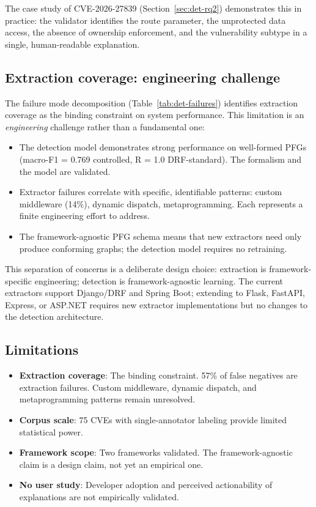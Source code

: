 The case study of CVE-2026-27839 (Section~\ref{sec:det-rq2}) demonstrates
this in practice: the validator identifies the route parameter, the
unprotected data access, the absence of ownership enforcement, and the
vulnerability subtype in a single, human-readable explanation.

\subsection{Extraction coverage: engineering challenge}
\label{sec:det-extraction-challenge}

The failure mode decomposition (Table~\ref{tab:det-failures}) identifies
extraction coverage as the binding constraint on system performance. This
limitation is an \emph{engineering} challenge rather than a fundamental one:
\begin{itemize}
    \item The detection model demonstrates strong performance on well-formed
    PFGs (macro-F1 = 0.769 controlled, R = 1.0 DRF-standard). The formalism
    and the model are validated.
    \item Extractor failures correlate with specific, identifiable patterns:
    custom middleware (14\%), dynamic dispatch, metaprogramming. Each
    represents a finite engineering effort to address.
    \item The framework-agnostic PFG schema means that new extractors need
    only produce conforming graphs; the detection model requires no
    retraining.
\end{itemize}

This separation of concerns is a deliberate design choice: extraction is
framework-specific engineering; detection is framework-agnostic learning.
The current extractors support Django/DRF and Spring Boot; extending to
Flask, FastAPI, Express, or ASP.NET requires new extractor implementations
but no changes to the detection architecture.

\subsection{Limitations}
\label{sec:det-limits}

\begin{itemize}
    \item \textbf{Extraction coverage}: The binding constraint. 57\% of
    false negatives are extraction failures. Custom middleware, dynamic
    dispatch, and metaprogramming patterns remain unresolved.
    \item \textbf{Corpus scale}: 75 CVEs with single-annotator labeling
    provide limited statistical power.
    \item \textbf{Framework scope}: Two frameworks validated. The
    framework-agnostic claim is a design claim, not yet an empirical one.
    \item \textbf{No user study}: Developer adoption and perceived
    actionability of explanations are not empirically validated.
\end{itemize}


